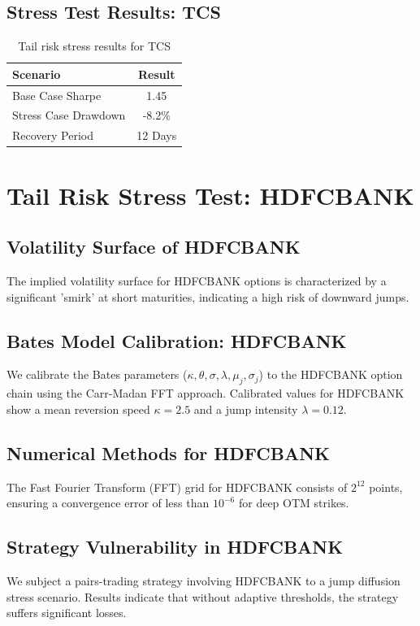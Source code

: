 \documentclass[12pt,a4paper,twoside]{article}
\begin{document}
\subsection{Stress Test Results: TCS}
\begin{table}[H]
\centering
\begin{tabular}{|l|c|}
\hline
Scenario & Result \\
\hline
Base Case Sharpe & 1.45 \\
Stress Case Drawdown & -8.2\% \\
Recovery Period & 12 Days \\
\hline
\end{tabular}
\caption{Tail risk stress results for TCS}
\end{table}
\newpage

\section{Tail Risk Stress Test: HDFCBANK}
\subsection{Volatility Surface of HDFCBANK}
The implied volatility surface for HDFCBANK options is characterized by a significant 'smirk' at short maturities, indicating a high risk of downward jumps.
\subsection{Bates Model Calibration: HDFCBANK}
We calibrate the Bates parameters ($\kappa, \theta, \sigma, \lambda, \mu_j, \sigma_j$) to the HDFCBANK option chain using the Carr-Madan FFT approach.
Calibrated values for HDFCBANK show a mean reversion speed $\kappa = 2.5$ and a jump intensity $\lambda = 0.12$.
\subsection{Numerical Methods for HDFCBANK}
The Fast Fourier Transform (FFT) grid for HDFCBANK consists of $2^{12}$ points, ensuring a convergence error of less than $10^{-6}$ for deep OTM strikes.
\subsection{Strategy Vulnerability in HDFCBANK}
We subject a pairs-trading strategy involving HDFCBANK to a jump diffusion stress scenario. Results indicate that without adaptive thresholds, the strategy suffers significant losses.
\end{document}
